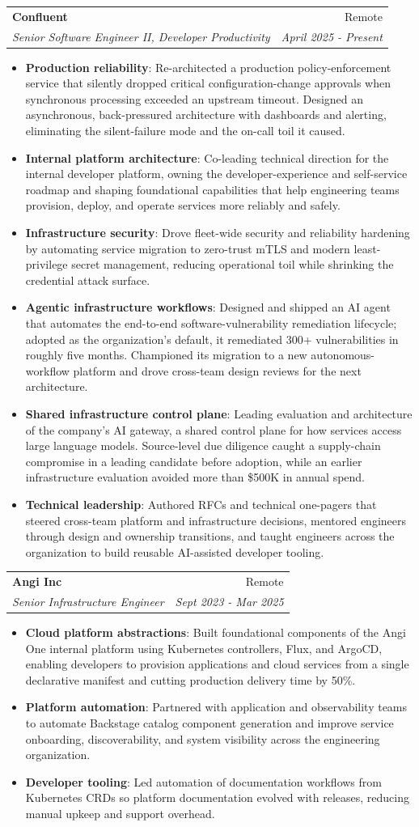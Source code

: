 \documentclass[letterpaper,11pt]{article}
\makeatletter
\newcommand{\resumeItem}[2]{
\item\small{\textbf{#1}{: #2 \vspace{-2pt}}}
}
\newcommand{\resumeSubheading}[4]{
\vspace{-1pt}\item
\begin{tabular*}{0.97\textwidth}[t]{l@{\extracolsep{\fill}}r}
    \textbf{#1} & #2 \\
    \textit{\small#3} & \textit{\small #4} \\
\end{tabular*}\vspace{-3pt}
}
\newcommand{\resumeItemListStart}{\begin{itemize}}
\newcommand{\resumeItemListEnd}{\end{itemize}\vspace{-5pt}}
\makeatother
\begin{document}
\resumeSubheading
{Confluent}{Remote}
{Senior Software Engineer II, Developer Productivity}{April 2025 - Present}
\resumeItemListStart
\resumeItem{Production reliability}
{Re-architected a production policy-enforcement service that silently dropped critical configuration-change approvals when synchronous processing exceeded an upstream timeout. Designed an asynchronous, back-pressured architecture with dashboards and alerting, eliminating the silent-failure mode and the on-call toil it caused.}
\resumeItem{Internal platform architecture}
{Co-leading technical direction for the internal developer platform, owning the developer-experience and self-service roadmap and shaping foundational capabilities that help engineering teams provision, deploy, and operate services more reliably and safely.}
\resumeItem{Infrastructure security}
{Drove fleet-wide security and reliability hardening by automating service migration to zero-trust mTLS and modern least-privilege secret management, reducing operational toil while shrinking the credential attack surface.}
\resumeItem{Agentic infrastructure workflows}
{Designed and shipped an AI agent that automates the end-to-end software-vulnerability remediation lifecycle; adopted as the organization's default, it remediated 300+ vulnerabilities in roughly five months. Championed its migration to a new autonomous-workflow platform and drove cross-team design reviews for the next architecture.}
\resumeItem{Shared infrastructure control plane}
{Leading evaluation and architecture of the company's AI gateway, a shared control plane for how services access large language models. Source-level due diligence caught a supply-chain compromise in a leading candidate before adoption, while an earlier infrastructure evaluation avoided more than \$500K in annual spend.}
\resumeItem{Technical leadership}
{Authored RFCs and technical one-pagers that steered cross-team platform and infrastructure decisions, mentored engineers through design and ownership transitions, and taught engineers across the organization to build reusable AI-assisted developer tooling.}
\resumeItemListEnd

\resumeSubheading
{Angi Inc}{Remote}
{Senior Infrastructure Engineer}{Sept 2023 - Mar 2025}
\resumeItemListStart
\resumeItem{Cloud platform abstractions}
{Built foundational components of the Angi One internal platform using Kubernetes controllers, Flux, and ArgoCD, enabling developers to provision applications and cloud services from a single declarative manifest and cutting production delivery time by 50\%.}
\resumeItem{Platform automation}
{Partnered with application and observability teams to automate Backstage catalog component generation and improve service onboarding, discoverability, and system visibility across the engineering organization.}
\resumeItem{Developer tooling}
{Led automation of documentation workflows from Kubernetes CRDs so platform documentation evolved with releases, reducing manual upkeep and support overhead.}
\resumeItemListEnd
\end{document}
